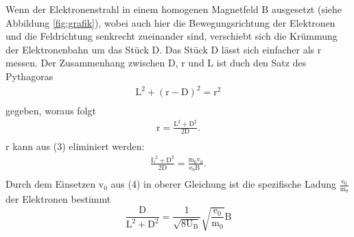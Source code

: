 Wenn der Elektronenstrahl in einem homogenen Magnetfeld B  ausgesetzt (siehe Abbildung \ref{fig:grafik}), wobei auch hier die Bewegungsrichtung der Elektronen und die Feldrichtung senkrecht zueinander sind,  verschiebt sich die Krümmung der Elektronenbahn um das Stück D.
Das Stück D lässt sich einfacher als r messen. 
Der Zusammenhang zwischen D, r und L ist duch den Satz des Pythagoras 
\begin{align*} 
    {\text{L}}^2  + {(\text{r}-\text{D})^2}= {\text{r}}^2 \\
\end{align*}
\noindent gegeben, woraus folgt 
\begin{align*} 
    \text{r} =  \frac{{\text{L}}^2 +{\text{D}}^2 }{2\text{D} }.\\
\end{align*}
\noindent r kann aus (3) eliminiert werden:
\begin{align*} 
    \frac{{\text{L}}^2 +{\text{D}}^2 }{2\text{D} }= \frac{\text{m}_0 \text{v}_0 }{\text{e}_0 \text{B }}.\\
\end{align*}
Durch dem Einsetzen $\text{v}_0$ aus (4) in oberer Gleichung ist die spezifische Ladung $\frac{\text{e}_0}{\text{m}_0}$ der Elektronen bestimmt
\begin{equation}
    \frac{\text{D} }{{\text{L}}^2 +{\text{D}}^2 }  = \frac{1}{\sqrt{8\text{U}_{\text{B}}} } \sqrt{\frac{\text{e}_0}{\text{m}_0}} \text{B}
\end{equation}




